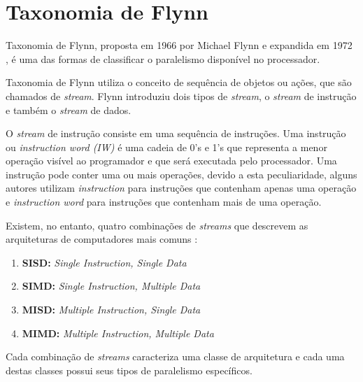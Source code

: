 \section{Taxonomia de Flynn}

Taxonomia de Flynn, proposta em 1966 \cite{Flynn:1966} por Michael 
Flynn e expandida em 1972 \cite{Flynn:1972}, é uma das formas de classificar o 
paralelismo disponível no processador.  

Taxonomia de Flynn utiliza o conceito de sequência de objetos ou ações, que são
chamados de \textit{stream}.
Flynn introduziu dois tipos de \textit{stream}, o 
\textit{stream} de instrução e também o \textit{stream} de dados. 

O \textit{stream} de instrução consiste em uma sequência de instruções. 
Uma instrução ou \textit{instruction word (IW)} é uma cadeia de 0's e 1's que 
representa a menor operação visível ao programador e que será executada pelo 
processador. 
Uma instrução pode conter uma ou mais operações, devido a esta peculiaridade,
alguns autores utilizam \textit{instruction} para instruções que contenham 
apenas uma operação e \textit{instruction word} para instruções que contenham 
mais de uma operação.

\begin{comment}
Processadores escalares (\textit{scalar processors}) e processadores
superescalares (\textit{superscalar processors}) executam uma ou mais
\textit{instructions} por ciclo de \textit{clock} da máquina. 
\end{comment}

Existem, no entanto, quatro combinações de \textit{streams} que descrevem as 
arquiteturas de computadores mais comuns \cite{Flynn:1996}:

\begin{enumerate}
        \item \textbf{SISD:} \textit{Single Instruction, Single Data}
        \item \textbf{SIMD:} \textit{Single Instruction, Multiple Data}
        \item \textbf{MISD:} \textit{Multiple Instruction, Single Data}
        \item \textbf{MIMD:} \textit{Multiple Instruction, Multiple Data}
\end{enumerate}

Cada combinação de \textit{streams} caracteriza uma classe de arquitetura 
e cada uma destas classes possui seus tipos de paralelismo específicos.


